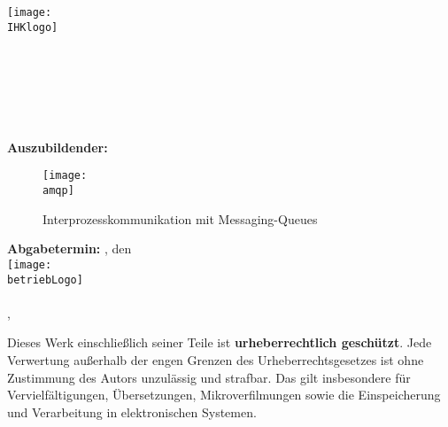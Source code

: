 \begin{titlepage}

\begin{center}
\texttt{[image: \\IHKlogo]}\\[0.5ex]
\Large{\ausbildungsberuf}\\
\LARGE{\betreff}\\
\huge{\textbf{\titelOne\\\titelTwo}}\\[0.5ex]
\Large{\textbf{\untertitelOne}}\\
\Large{\textbf{\untertitelTwo}}\\[1.5ex]

\normalsize
\textbf{Auszubildender:} \autorName\\[2.5ex]

\begin{figure}[htb]
    \centering
    \texttt{[image: \\amqp]}\\[1ex]
    \caption{Interprozesskommunikation mit Messaging-Queues}
    \label{fig:redHatCom}
\end{figure}

\textbf{Abgabetermin:} \abgabeOrt{}, den \abgabeTermin\\[3ex]

\texttt{[image: \\betriebLogo]}\\
\betriebName{}\\
\betriebAnschrift{}, \betriebOrt\\[2.5ex]
\end{center}

\small
\noindent
Dieses Werk einschließlich seiner Teile ist \textbf{urheberrechtlich geschützt}.
Jede Verwertung außerhalb der engen Grenzen des Urheberrechtsgesetzes ist ohne Zustimmung des Autors unzulässig und strafbar.
Das gilt insbesondere für Vervielfältigungen, Übersetzungen, Mikroverfilmungen sowie die Einspeicherung und Verarbeitung in elektronischen Systemen.

\end{titlepage}